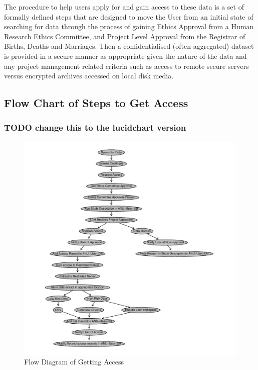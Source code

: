 \documentclass[a4paper]{article}
\begin{document}
The procedure to help users apply for and gain access to these data is a set of formally defined steps that are designed to move the User from an initial state of searching for data through the process of gaining Ethics Approval from a Human Research Ethics Committee, and Project Level Approval from the Registrar of Births, Deaths and Marriages.  Then a confidentialised (often aggregated) dataset is provided in a secure manner as appropriate given the nature of the data and any project management related criteria such as access to remote secure servers versus encrypted archives accessed on local disk media.
\subsection{Flow Chart of Steps to Get Access}
\label{sec-3-1}
\subsubsection{\textbf{TODO} change this to the lucidchart version}
\label{sec-3-1-1}

\begin{figure}[!h]
\centering
\includegraphics[width=\textwidth]{DataAccessFlowDiagram-GettingAccess.pdf}
\caption{Flow Diagram of Getting Access}
\label{fig:DataAccessFlowDiagram-GettingAccess}
\end{figure}
\clearpage
\end{document}

